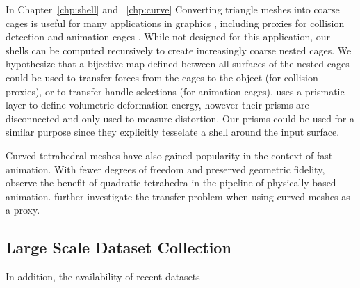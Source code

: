 In Chapter~\ref{chp:shell} and ~\ref{chp:curve}
Converting triangle meshes into coarse cages is useful for many applications in graphics \cite{sacht2015nested}, including proxies for collision detection \cite{Calderon:2017} and animation cages \cite{Thiery:2012}. While not designed for this application, our shells can be computed recursively to create increasingly coarse nested cages. We hypothesize that a bijective map defined between all surfaces of the nested cages could be used to transfer forces from the cages to the object (for collision proxies), or to transfer handle selections (for animation cages). \cite{botsch2006primo,botsch2003multiresolution} uses a prismatic layer to define volumetric deformation energy, however their prisms are disconnected and only used to measure distortion. Our prisms could be used for a similar purpose since they explicitly tesselate a shell around the input surface.

Curved tetrahedral meshes have also gained popularity in the context of fast animation. With fewer degrees of freedom and preserved geometric fidelity, 
\cite{mezger2007finite} observe the benefit of quadratic tetrahedra in the pipeline of physically based animation.
\cite{Suwelack2013} further investigate the transfer problem when using curved meshes as a proxy.

\subsection{Large Scale Dataset Collection} 

In addition, the availability of recent datasets \cite{koch2019abc, zhou2016thingi10k}
